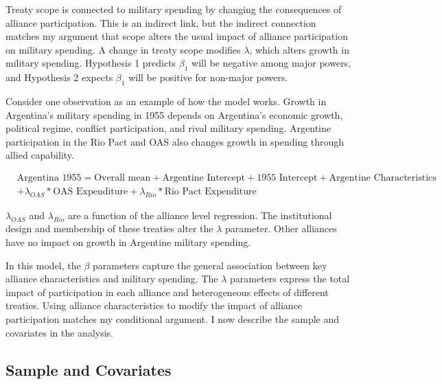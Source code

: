 \documentclass[12pt]{article}
\begin{document}
Treaty scope is connected to military spending by changing the consequences of alliance participation.
This is an indirect link, but the indirect connection matches my argument that scope alters the usual impact of alliance participation on military spending.  
A change in treaty scope modifies $\lambda$, which alters growth in military spending.
Hypothesis 1 predicts $\beta_1$ will be negative among major powers, and Hypothesis 2 expects $\beta_1$ will be positive for non-major powers.  


Consider one observation as an example of how the model works. 
Growth in Argentina's military spending in 1955 depends on Argentina's economic growth, political regime, conflict participation, and rival military spending. 
Argentine participation in the Rio Pact and OAS also changes growth in spending through allied capability. 


\begin{equation}
\begin{split}
& \mbox{Argentina 1955} = \mbox{Overall mean}
+ \mbox{Argentine Intercept} + \mbox{1955 Intercept} 
+ \mbox{Argentine Characteristics} \\
& + \lambda_{OAS} * \mbox{OAS Expenditure} + \lambda_{Rio} * \mbox{Rio Pact Expenditure}
\end{split} 
\end{equation}


$\lambda_{OAS}$ and $\lambda_{Rio}$ are a function of the alliance level regression. 
The institutional design and membership of these treaties alter the $\lambda$ parameter.
Other alliances have no impact on growth in Argentine military spending. 


In this model, the $\beta$ parameters capture the general association between key alliance characteristics and military spending. 
The $\lambda$ parameters express the total impact of participation in each alliance and heterogeneous effects of different treaties. 
Using alliance characteristics to modify the impact of alliance participation matches my conditional argument. 
I now describe the sample and covariates in the analysis.  



\subsection{Sample and Covariates} 
\end{document}
